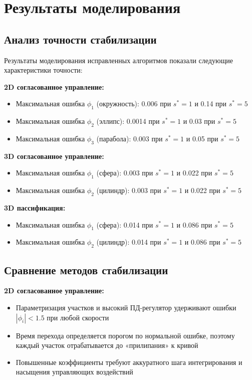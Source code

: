 \section{Результаты моделирования}

\subsection{Анализ точности стабилизации}

Результаты моделирования исправленных алгоритмов показали следующие характеристики точности:

\textbf{2D согласованное управление:}
\begin{itemize}
\item Максимальная ошибка $\phi_1$ (окружность): 0.006 при $s^* = 1$ и 0.14 при $s^* = 5$
\item Максимальная ошибка $\phi_2$ (эллипс): 0.0014 при $s^* = 1$ и 0.03 при $s^* = 5$
\item Максимальная ошибка $\phi_3$ (парабола): 0.003 при $s^* = 1$ и 0.05 при $s^* = 5$
\end{itemize}

\textbf{3D согласованное управление:}
\begin{itemize}
\item Максимальная ошибка $\phi_1$ (сфера): 0.003 при $s^* = 1$ и 0.022 при $s^* = 5$
\item Максимальная ошибка $\phi_2$ (цилиндр): 0.003 при $s^* = 1$ и 0.022 при $s^* = 5$
\end{itemize}

\textbf{3D пассификация:}
\begin{itemize}
\item Максимальная ошибка $\phi_1$ (сфера): 0.014 при $s^* = 1$ и 0.086 при $s^* = 5$
\item Максимальная ошибка $\phi_2$ (цилиндр): 0.014 при $s^* = 1$ и 0.086 при $s^* = 5$
\end{itemize}

\subsection{Сравнение методов стабилизации}

\textbf{2D согласованное управление:}
\begin{itemize}
\item Параметризация участков и высокий ПД-регулятор удерживают ошибки $|\phi_i| < 1.5$ при любой скорости
\item Время перехода определяется порогом по нормальной ошибке, поэтому каждый участок отрабатывается до «прилипания» к кривой
\item Повышенные коэффициенты требуют аккуратного шага интегрирования и насыщения управляющих воздействий
\end{itemize}

